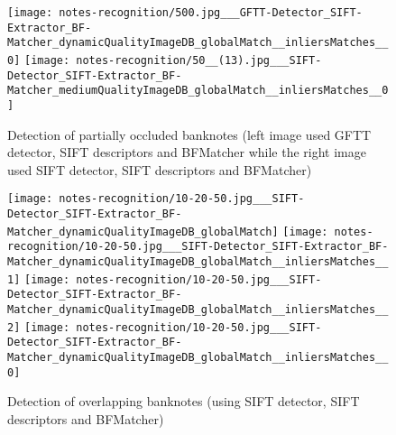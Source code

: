 \begin{figure}[H]
	\centering
	\texttt{[image: notes-recognition/500.jpg\_\_\_GFTT-Detector\_SIFT-Extractor\_BF-Matcher\_dynamicQualityImageDB\_globalMatch\_\_inliersMatches\_\_0]}\hfill
	\texttt{[image: notes-recognition/50\_\_(13).jpg\_\_\_SIFT-Detector\_SIFT-Extractor\_BF-Matcher\_mediumQualityImageDB\_globalMatch\_\_inliersMatches\_\_0]}
	\caption{Detection of partially occluded banknotes (left image used GFTT detector, SIFT descriptors and BFMatcher while the right image used SIFT detector, SIFT descriptors and BFMatcher)}
	\label{fig:recognition-partially-occluded-banknotes}
\end{figure}

\begin{figure}[H]
	\centering
	\texttt{[image: notes-recognition/10-20-50.jpg\_\_\_SIFT-Detector\_SIFT-Extractor\_BF-Matcher\_dynamicQualityImageDB\_globalMatch]}
	\texttt{[image: notes-recognition/10-20-50.jpg\_\_\_SIFT-Detector\_SIFT-Extractor\_BF-Matcher\_dynamicQualityImageDB\_globalMatch\_\_inliersMatches\_\_1]}
	\texttt{[image: notes-recognition/10-20-50.jpg\_\_\_SIFT-Detector\_SIFT-Extractor\_BF-Matcher\_dynamicQualityImageDB\_globalMatch\_\_inliersMatches\_\_2]}
	\texttt{[image: notes-recognition/10-20-50.jpg\_\_\_SIFT-Detector\_SIFT-Extractor\_BF-Matcher\_dynamicQualityImageDB\_globalMatch\_\_inliersMatches\_\_0]}
	\caption{Detection of overlapping banknotes (using SIFT detector, SIFT descriptors and BFMatcher)}
	\label{fig:recognition-overlapping-banknotes}
\end{figure}
